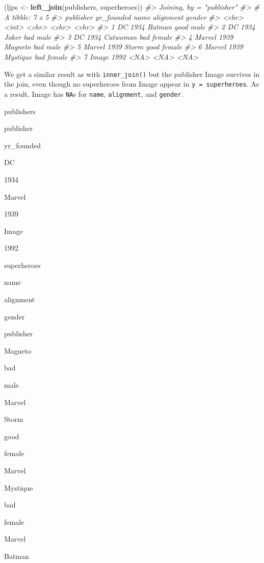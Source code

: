 \documentclass[
]{book}
\newenvironment{Shaded}{\begin{snugshade}}{\end{snugshade}}
\newcommand{\CommentTok}[1]{\textcolor[rgb]{0.56,0.35,0.01}{\textit{#1}}}
\newcommand{\KeywordTok}[1]{\textcolor[rgb]{0.13,0.29,0.53}{\textbf{#1}}}
\newcommand{\NormalTok}[1]{#1}
\newcommand{\StringTok}[1]{\textcolor[rgb]{0.31,0.60,0.02}{#1}}
\begin{document}
\begin{Shaded}
\begin{Highlighting}[]
\NormalTok{(ljps <-}\StringTok{ }\KeywordTok{left_join}\NormalTok{(publishers, superheroes))}
\CommentTok{#> Joining, by = "publisher"}
\CommentTok{#> # A tibble: 7 x 5}
\CommentTok{#>   publisher yr_founded name     alignment gender}
\CommentTok{#>   <chr>          <int> <chr>    <chr>     <chr> }
\CommentTok{#> 1 DC              1934 Batman   good      male  }
\CommentTok{#> 2 DC              1934 Joker    bad       male  }
\CommentTok{#> 3 DC              1934 Catwoman bad       female}
\CommentTok{#> 4 Marvel          1939 Magneto  bad       male  }
\CommentTok{#> 5 Marvel          1939 Storm    good      female}
\CommentTok{#> 6 Marvel          1939 Mystique bad       female}
\CommentTok{#> 7 Image           1992 <NA>     <NA>      <NA>}
\end{Highlighting}
\end{Shaded}

We get a similar result as with \texttt{inner\_join()} but the publisher Image survives in the join, even though no superheroes from Image appear in \texttt{y\ =\ superheroes}. As a result, Image has \texttt{NA}s for \texttt{name}, \texttt{alignment}, and \texttt{gender}.

publishers

publisher

yr\_founded

DC

1934

Marvel

1939

Image

1992

superheroes

name

alignment

gender

publisher

Magneto

bad

male

Marvel

Storm

good

female

Marvel

Mystique

bad

female

Marvel

Batman
\end{document}
